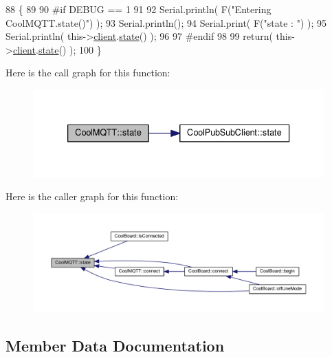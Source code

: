 \begin{DoxyCode}
88 \{
89 
90 \textcolor{preprocessor}{#if DEBUG == 1 }
91 
92     Serial.println( F(\textcolor{stringliteral}{"Entering CoolMQTT.state()"}) );
93     Serial.println();   
94     Serial.print( F(\textcolor{stringliteral}{"state : "}) );
95     Serial.println( this->\hyperlink{class_cool_m_q_t_t_afed1372683c44893b4668d0f1771f514}{client}.\hyperlink{class_cool_pub_sub_client_a3245a5afc6d22e61270dcfe392ccb866}{state}() );
96 
97 \textcolor{preprocessor}{#endif}
98     
99     \textcolor{keywordflow}{return}( this->\hyperlink{class_cool_m_q_t_t_afed1372683c44893b4668d0f1771f514}{client}.\hyperlink{class_cool_pub_sub_client_a3245a5afc6d22e61270dcfe392ccb866}{state}() );
100 \}
\end{DoxyCode}
Here is the call graph for this function\+:\nopagebreak
\begin{figure}[H]
\begin{center}
\leavevmode
\includegraphics[width=333pt]{d0/dd0/class_cool_m_q_t_t_a5d003307eff78efbd585e42b43b72b6d_cgraph}
\end{center}
\end{figure}
Here is the caller graph for this function\+:\nopagebreak
\begin{figure}[H]
\begin{center}
\leavevmode
\includegraphics[width=350pt]{d0/dd0/class_cool_m_q_t_t_a5d003307eff78efbd585e42b43b72b6d_icgraph}
\end{center}
\end{figure}


\subsection{Member Data Documentation}
\mbox{\label{class_cool_m_q_t_t_a7f3cf26b51d6770f216e42c5ef13ca9f}} 
